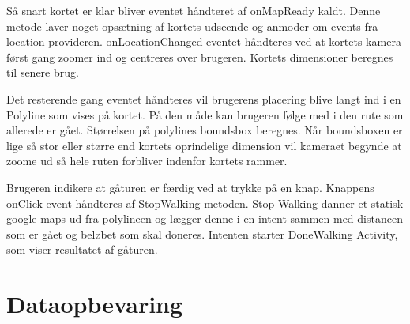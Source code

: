 Så snart kortet er klar bliver eventet håndteret af onMapReady kaldt. Denne metode laver noget opsætning af kortets udseende og anmoder om events fra location provideren. onLocationChanged eventet håndteres ved at kortets kamera først gang zoomer ind og centreres over brugeren. Kortets dimensioner beregnes til senere brug.

Det resterende gang eventet håndteres vil brugerens placering blive langt ind i en Polyline som vises på kortet. På den måde kan brugeren følge med i den rute som allerede er gået. Størrelsen på polylines boundsbox beregnes. Når boundsboxen er lige så stor eller større end kortets oprindelige dimension vil kameraet begynde at zoome ud så hele ruten forbliver indenfor kortets rammer.

Brugeren indikere at gåturen er færdig ved at trykke på en knap. Knappens onClick event håndteres af StopWalking metoden. Stop Walking danner et statisk google maps ud fra polylineen og lægger denne i en intent sammen med distancen som er gået og beløbet som skal doneres. Intenten starter DoneWalking Activity, som viser resultatet af gåturen.




\FloatBarrier
\section{Dataopbevaring}